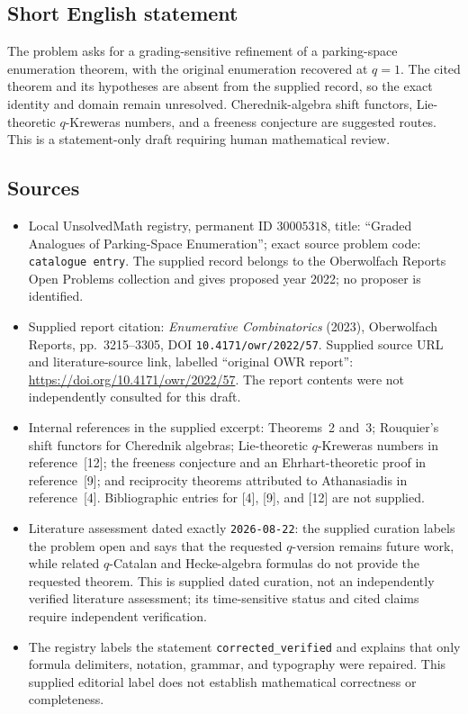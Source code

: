 \documentclass[11pt]{article}
\begin{document}
\subsection{Short English statement}
The problem asks for a grading-sensitive refinement of a parking-space enumeration theorem, with the original enumeration recovered at \(q=1\). The cited theorem and its hypotheses are absent from the supplied record, so the exact identity and domain remain unresolved. Cherednik-algebra shift functors, Lie-theoretic \(q\)-Kreweras numbers, and a freeness conjecture are suggested routes. This is a statement-only draft requiring human mathematical review.
\subsection{Sources}
\begin{itemize}
\item Local UnsolvedMath registry, permanent ID \(30005318\), title: ``Graded Analogues of Parking-Space Enumeration''; exact source problem code: \texttt{catalogue entry}. The supplied record belongs to the Oberwolfach Reports Open Problems collection and gives proposed year 2022; no proposer is identified.
\item Supplied report citation: \emph{Enumerative Combinatorics} (2023), Oberwolfach Reports, pp.~3215--3305, DOI \texttt{10.4171/owr/2022/57}. Supplied source URL and literature-source link, labelled ``original OWR report'': \url{https://doi.org/10.4171/owr/2022/57}. The report contents were not independently consulted for this draft.
\item Internal references in the supplied excerpt: Theorems~2 and~3; Rouquier's shift functors for Cherednik algebras; Lie-theoretic \(q\)-Kreweras numbers in reference~[12]; the freeness conjecture and an Ehrhart-theoretic proof in reference~[9]; and reciprocity theorems attributed to Athanasiadis in reference~[4]. Bibliographic entries for [4], [9], and [12] are not supplied.
\item Literature assessment dated exactly \texttt{2026-08-22}: the supplied curation labels the problem open and says that the requested \(q\)-version remains future work, while related \(q\)-Catalan and Hecke-algebra formulas do not provide the requested theorem. This is supplied dated curation, not an independently verified literature assessment; its time-sensitive status and cited claims require independent verification.
\item The registry labels the statement \texttt{corrected\_verified} and explains that only formula delimiters, notation, grammar, and typography were repaired. This supplied editorial label does not establish mathematical correctness or completeness.
\end{itemize}
\end{document}
